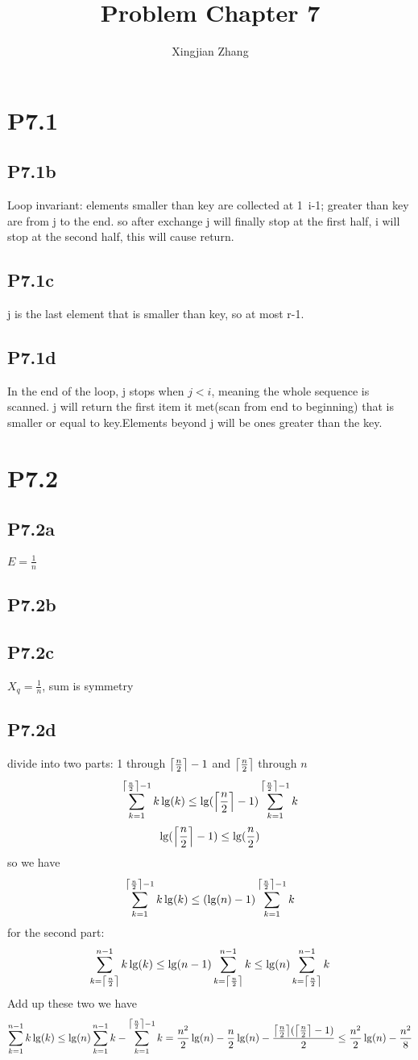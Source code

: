 \documentclass{article}
\title{Problem Chapter 7}
\author{Xingjian Zhang}
\DeclarePairedDelimiter{\ceil}{\lceil}{\rceil}
\begin{document}
\section*{P7.1}
\subsection*{P7.1b}
Loop invariant: elements smaller than key are collected at 1~i-1;
greater than key are from j to the end. so after exchange j will finally stop at the first half, i will stop at the second half, this will cause return.
\subsection*{P7.1c}
j is the last element that is smaller than key, so at most r-1.
\subsection*{P7.1d}
In the end of the loop, j stops when $j < i$, meaning the whole sequence is scanned. j will return the first item it met(scan from end to beginning) that is smaller or equal to key.Elements beyond j will be ones greater than the key.
\section*{P7.2}
\subsection*{P7.2a}
$ E = \frac{1}{n} $
\subsection*{P7.2b}
\subsection*{P7.2c}
$X_{q} = \frac{1}{n}$, sum is symmetry
\subsection*{P7.2d}
divide into two parts: 1 through $\ceil*{\frac{n}{2}}-1$ and $\ceil*{\frac{n}{2}}$ through $n$
$$ \sum_{k=1}^{\ceil*{\frac{n}{2}}-1}k\lg(k) \leq \lg({\ceil*{\frac{n}{2}}-1})\sum_{k=1}^{\ceil*{\frac{n}{2}}-1}k   $$
$$\lg(\ceil*{\frac{n}{2}}-1) \leq \lg(\frac{n}{2})$$
so we have 
$$\sum_{k=1}^{\ceil*{\frac{n}{2}}-1}k\lg(k) \leq (\lg(n)-1)\sum_{k=1}^{\ceil*{\frac{n}{2}}-1}k$$
for the second part:
$$\sum_{k=\ceil*{\frac{n}{2}}}^{n-1}k\lg(k) \leq \lg({n-1})\sum_{k=\ceil*{\frac{n}{2}}}^{n-1}k \leq \lg(n)\sum_{k=\ceil*{\frac{n}{2}}}^{n-1}k $$
Add up these two we have
$$\sum_{k=1}^{n-1}k\lg(k) \leq \lg(n)\sum_{k=1}^{n-1}k - \sum_{k=1}^{\ceil*{\frac{n}{2}}-1}k = \frac{n^2}{2}\lg(n)-\frac{n}{2}\lg(n)-\frac{\ceil*{\frac{n}{2}}(\ceil*{\frac{n}{2}}-1)}{2} \leq \frac{n^2}{2}\lg(n) - \frac{n^2}{8}$$
\end{document}
